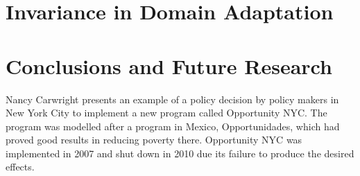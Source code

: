 \documentclass[a4paper,12pt]{article}
\begin{document}








\section{Invariance in Domain Adaptation}






\section{Conclusions and Future Research}





Nancy Carwright \parencite*{Cartwright2016} presents an example of a policy decision by policy makers in New York City to implement a new program called Opportunity NYC. The program was modelled after a program in Mexico, Opportunidades, which had proved good results in reducing poverty there. Opportunity NYC was implemented in 2007 and shut down in 2010 due its failure to produce the desired effects. 
\end{document}
